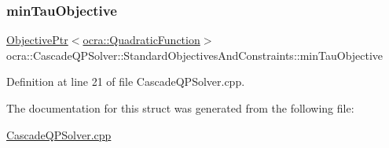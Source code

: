 \subsubsection{\texorpdfstring{min\+Tau\+Objective}{minTauObjective}}
{\footnotesize\ttfamily \hyperlink{classocra_1_1ObjectivePtr}{Objective\+Ptr}$<$\hyperlink{classocra_1_1QuadraticFunction}{ocra\+::\+Quadratic\+Function}$>$ ocra\+::\+Cascade\+Q\+P\+Solver\+::\+Standard\+Objectives\+And\+Constraints\+::min\+Tau\+Objective}



Definition at line 21 of file Cascade\+Q\+P\+Solver.\+cpp.



The documentation for this struct was generated from the following file\+:\begin{DoxyCompactItemize}
\item 
\hyperlink{CascadeQPSolver_8cpp}{Cascade\+Q\+P\+Solver.\+cpp}\end{DoxyCompactItemize}
